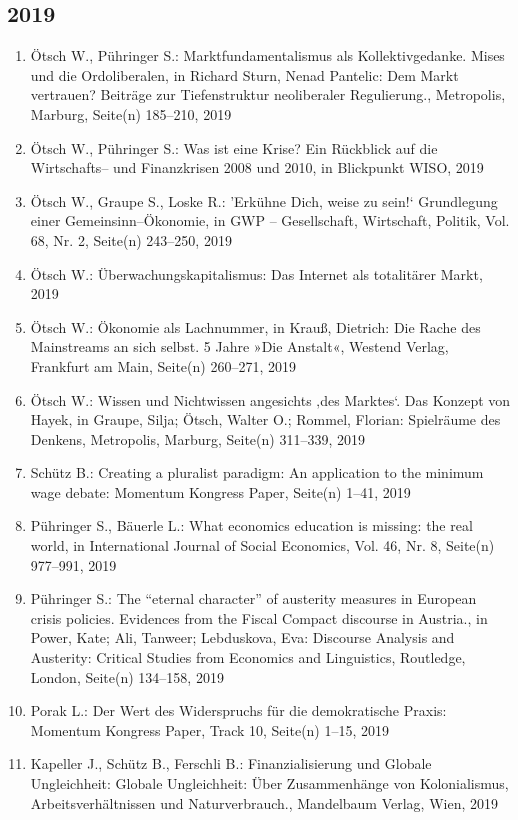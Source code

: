 \subsection*{2019}
\begin{enumerate}
    	 \item Ötsch W., Pühringer S.: Marktfundamentalismus als Kollektivgedanke. Mises und die Ordoliberalen, in Richard Sturn, Nenad Pantelic: Dem Markt vertrauen? Beiträge zur Tiefenstruktur neoliberaler Regulierung., Metropolis, Marburg, Seite(n) 185--210, 2019
	 \item Ötsch W., Pühringer S.: Was ist eine Krise? Ein Rückblick auf die Wirtschafts-- und Finanzkrisen 2008 und 2010, in Blickpunkt WISO, 2019
	 \item Ötsch W., Graupe S., Loske R.: ’Erkühne Dich, weise zu sein!‘ Grundlegung einer Gemeinsinn--Ökonomie, in GWP -- Gesellschaft, Wirtschaft, Politik, Vol. 68, Nr. 2, Seite(n) 243--250, 2019
	 \item Ötsch W.: Überwachungskapitalismus: Das Internet als totalitärer Markt, 2019
	 \item Ötsch W.: Ökonomie als Lachnummer, in Krauß, Dietrich: Die Rache des Mainstreams an sich selbst. 5 Jahre »Die Anstalt«, Westend Verlag, Frankfurt am Main, Seite(n) 260--271, 2019
	 \item Ötsch W.: Wissen und Nichtwissen angesichts ‚des Marktes‘. Das Konzept von Hayek, in Graupe, Silja; Ötsch, Walter O.; Rommel, Florian: Spielräume des Denkens, Metropolis, Marburg, Seite(n) 311--339, 2019
	 \item Schütz B.: Creating a pluralist paradigm: An application to the minimum wage debate: Momentum Kongress Paper, Seite(n) 1--41, 2019
	 \item Pühringer S., Bäuerle L.: What economics education is missing: the real world, in International Journal of Social Economics, Vol. 46, Nr. 8, Seite(n) 977--991, 2019
	 \item Pühringer S.: The “eternal character” of austerity measures in European crisis policies. Evidences from the Fiscal Compact discourse in Austria., in Power, Kate; Ali, Tanweer; Lebduskova, Eva: Discourse Analysis and Austerity: Critical Studies from Economics and Linguistics, Routledge, London, Seite(n) 134--158, 2019
	 \item Porak L.: Der Wert des Widerspruchs für die demokratische Praxis: Momentum Kongress Paper, Track 10, Seite(n) 1--15, 2019
	 \item Kapeller J., Schütz B., Ferschli B.: Finanzialisierung und Globale Ungleichheit: Globale Ungleichheit: Über Zusammenhänge von Kolonialismus, Arbeitsverhältnissen und Naturverbrauch., Mandelbaum Verlag, Wien, 2019

\end{enumerate}
